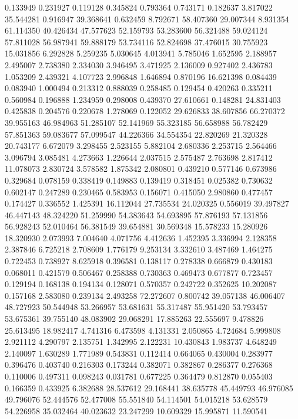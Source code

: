 0.133949
0.231927
0.119128
0.345824
0.793364
0.743171
0.182637
3.817022
35.544281
0.916947
39.368641
0.632459
8.792671
58.407360
29.007344
8.931354
61.114350
40.426434
47.577623
52.159793
53.283600
56.321488
59.024124
57.811028
56.987941
59.888179
53.734116
52.824698
37.476015
30.755923
15.031856
6.292828
5.259235
5.030645
4.013941
5.785046
1.652595
2.188957
2.495007
2.738380
2.334030
3.946495
3.471925
2.136009
0.927402
2.436783
1.053209
2.439321
4.107723
2.996848
1.646894
0.870196
16.621398
0.084439
0.083940
1.000494
0.213312
0.888039
0.258485
0.129454
0.420263
0.335211
0.560984
0.196888
1.234959
0.298008
0.439370
27.610661
0.148281
24.831403
0.425838
0.204576
0.220678
1.278069
0.122052
29.626833
38.607856
66.270372
39.955163
46.984963
51.285107
52.141969
55.323185
56.658988
56.782429
57.851363
59.083677
57.099547
44.226366
34.554354
22.820269
21.320328
20.743177
6.672079
3.298455
2.523155
5.882104
2.680336
2.253715
2.564466
3.096794
3.085481
4.273663
1.226644
2.037515
2.575487
2.763698
2.817412
11.078073
2.830724
3.578582
1.875342
2.080801
0.439210
0.577146
0.673986
0.329684
0.078159
0.338419
0.149883
0.139419
0.318451
0.025382
0.730632
0.602147
0.247289
0.230465
0.583953
0.156071
0.415050
2.980860
0.477457
0.174427
0.336552
1.425391
16.112044
27.735534
24.020325
0.556019
39.497827
46.447143
48.324220
51.259990
54.383643
54.693895
57.876193
57.131856
56.928243
52.010464
56.381549
39.654881
30.569348
15.578233
15.280926
18.320930
2.073993
7.004640
4.071756
4.412636
1.452395
3.336994
2.128358
2.387846
6.725218
2.708609
1.776179
9.253134
3.332610
3.487469
1.464275
0.722453
0.738927
8.625918
0.396581
0.138117
0.278338
0.666879
0.430183
0.068011
0.421579
0.506467
0.258388
0.730363
0.469473
0.677877
0.723457
0.129194
0.168138
0.194134
0.128071
0.570357
0.242722
0.352625
10.202087
0.157168
2.583080
0.239134
2.493258
72.272607
0.800742
39.057138
46.006407
48.727923
50.544948
53.266957
53.681631
55.317487
55.951420
53.793457
53.675361
39.755140
48.083902
29.068291
17.885263
22.555697
9.478826
25.613495
18.982417
4.741316
6.473598
4.131331
2.050865
4.724684
5.999808
2.921112
4.290797
2.135751
1.342995
2.122231
10.430843
1.983737
4.648249
2.140097
1.630289
1.771989
0.543831
0.112414
0.664065
0.430004
0.283977
0.396476
0.403740
0.216303
0.173244
0.382071
0.382867
0.286377
0.276368
0.110006
0.497311
0.098243
0.031781
0.677225
0.364479
0.812870
0.055403
0.166359
0.433925
6.382688
28.537612
29.168441
38.635778
45.449793
46.976085
49.796076
52.444576
52.477008
55.551840
54.114501
54.015218
53.628579
54.226958
35.032464
40.023632
23.247299
10.609329
15.995871
11.590541
